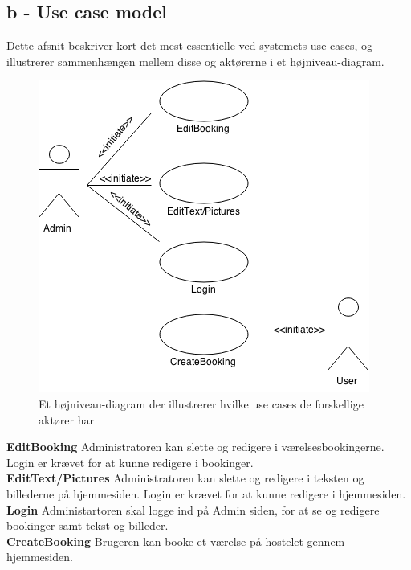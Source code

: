 \documentclass[12pt,a4paper]{article}
\begin{document}
\subsection{b - Use case model}
Dette afsnit beskriver kort det mest essentielle ved systemets use cases, og illustrerer sammenhængen mellem disse og aktørerne i et højniveau-diagram. 
\begin{figure}[H]
\centering
\includegraphics[scale=0.7]{hoejniveau.png}
\caption{Et højniveau-diagram der illustrerer hvilke use cases de forskellige aktører har}
\end{figure}
\textbf{EditBooking}  Administratoren kan slette og redigere i værelsesbookingerne. Login er krævet for at kunne redigere i bookinger.\\
\textbf{EditText/Pictures} Administratoren kan slette og redigere i teksten og billederne på hjemmesiden. Login er krævet for at kunne redigere i hjemmesiden.\\
\textbf{Login} Administartoren skal logge ind på Admin siden, for at se og redigere bookinger samt tekst og billeder.\\
\textbf{CreateBooking} Brugeren kan booke et værelse på hostelet gennem hjemmesiden.\\
\newpage
\end{document}

